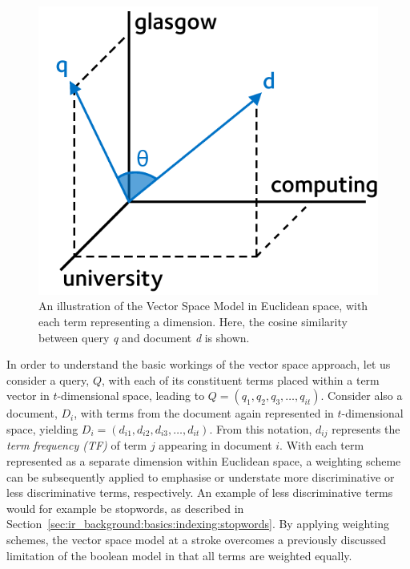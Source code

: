 \begin{figure}
    \begin{center}
    \vspace*{-10mm}
    \includegraphics[width=1\textwidth]{figures/ch2-vector.pdf}
    \end{center}
    \vspace*{-4mm}
    \caption[Vector Space Model (Cosine similarity)]{An illustration of the Vector Space Model in Euclidean space, with each term representing a dimension. Here, the cosine similarity between query \emph{q} and document \emph{d} is shown.}
    \label{fig:vector_space}
\end{figure}

In order to understand the basic workings of the vector space approach, let us consider a query, $Q$, with each of its constituent terms placed within a term vector in $t$-dimensional space, leading to $Q = (q_1, q_2, q_3,\dotsc, q_{it})$. Consider also a document, $D_i$, with terms from the document again represented in $t$-dimensional space, yielding $D_i = (d_{i1}, d_{i2}, d_{i3},\dotsc, d_{it})$. From this notation, $d_{ij}$ represents the \emph{term frequency (TF)} of term $j$ appearing in document $i$. With each term represented as a separate dimension within Euclidean space, a weighting scheme can be subsequently applied to emphasise or understate more discriminative or less discriminative terms, respectively. An example of less discriminative terms would for example be stopwords, as described in Section~\ref{sec:ir_background:basics:indexing:stopwords}. By applying weighting schemes, the vector space model at a stroke overcomes a previously discussed limitation of the boolean model in that all terms are weighted equally.

